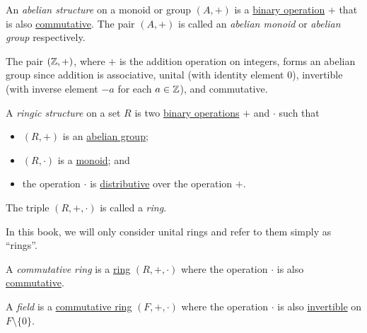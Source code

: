 \begin{definition}\label{def:abelian_structure}
  An \emph{abelian structure} on a monoid or group $(A, +)$ is a \hyperref[def:binary_operation]{binary operation} $+$ that is also \hyperref[def:commutative]{commutative}. The pair $(A, +)$ is called an \emph{abelian monoid} or \emph{abelian group} respectively.
\end{definition}

\begin{example}
  The pair $(\operatorname{\mathbb{Z}}, +)$, where $+$ is the addition operation on integers, forms an abelian group since addition is associative, unital (with identity element $0$), invertible (with inverse element $-a$ for each $a \in \operatorname{\mathbb{Z}}$), and commutative.
\end{example}

\begin{definition}\label{def:ringic_structure}
  A \emph{ringic structure} on a set $R$ is two \hyperref[def:binary_operation]{binary operations} $+$ and $\cdot$ such that
  \begin{itemize}
    \item $(R, +)$ is an \hyperref[def:abelian_structure]{abelian group};
    \item $(R, \cdot)$ is a \hyperref[def:monoidic_structure]{monoid}; and
    \item the operation $\cdot$ is \hyperref[def:distributive]{distributive} over the operation $+$.
  \end{itemize}
  The triple $(R, +, \cdot)$ is called a \emph{ring}.
\end{definition}

\begin{remark}
  In this book, we will only consider unital rings and refer to them simply as ``rings''.
\end{remark}

\begin{definition}\label{def:commutative_ring}
  A \emph{commutative ring} is a \hyperref[def:ringic_structure]{ring} $(R, +, \cdot)$ where the operation $\cdot$ is also \hyperref[def:commutative]{commutative}.
\end{definition}

\begin{definition}[Field]\label{def:field}
  A \emph{field} is a \hyperref[def:commutative_ring]{commutative ring} $(F, +, \cdot)$ where the operation $\cdot$ is also \hyperref[def:invertible]{invertible} on $F \setminus \{ 0 \}$.
\end{definition}

